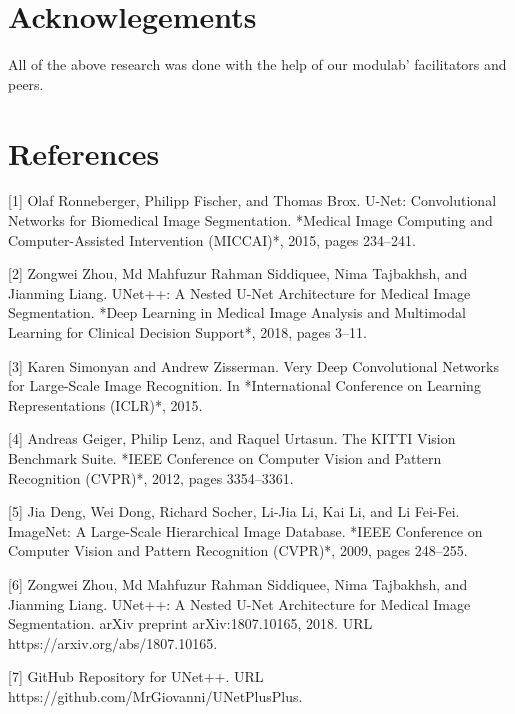 \documentclass[10pt,twocolumn,letterpaper,final]{article} %
\begin{document}
\section{Acknowlegements}
\label{sec:intro}
All of the above research was done with the help of our modulab' facilitators and peers.


\section{References}
\label{sec:intro}

[1] Olaf Ronneberger, Philipp Fischer, and Thomas Brox. U-Net: Convolutional Networks for Biomedical Image Segmentation. *Medical Image Computing and Computer-Assisted Intervention (MICCAI)*, 2015, pages 234–241.

[2] Zongwei Zhou, Md Mahfuzur Rahman Siddiquee, Nima Tajbakhsh, and Jianming Liang. UNet++: A Nested U-Net Architecture for Medical Image Segmentation. *Deep Learning in Medical Image Analysis and Multimodal Learning for Clinical Decision Support*, 2018, pages 3–11.

[3] Karen Simonyan and Andrew Zisserman. Very Deep Convolutional Networks for Large-Scale Image Recognition. In *International Conference on Learning Representations (ICLR)*, 2015.

[4] Andreas Geiger, Philip Lenz, and Raquel Urtasun. The KITTI Vision Benchmark Suite. *IEEE Conference on Computer Vision and Pattern Recognition (CVPR)*, 2012, pages 3354–3361.

[5] Jia Deng, Wei Dong, Richard Socher, Li-Jia Li, Kai Li, and Li Fei-Fei. ImageNet: A Large-Scale Hierarchical Image Database. *IEEE Conference on Computer Vision and Pattern Recognition (CVPR)*, 2009, pages 248–255.

[6] Zongwei Zhou, Md Mahfuzur Rahman Siddiquee, Nima Tajbakhsh, and Jianming Liang. UNet++: A Nested U-Net Architecture for Medical Image Segmentation. arXiv preprint arXiv:1807.10165, 2018. URL https://arxiv.org/abs/1807.10165.

[7] GitHub Repository for UNet++. URL https://github.com/MrGiovanni/UNetPlusPlus.
\end{document}

